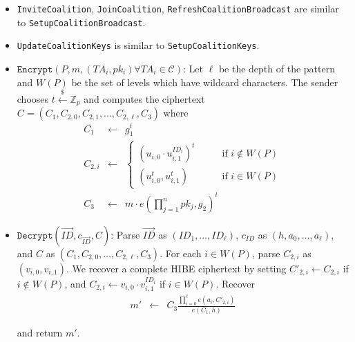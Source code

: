\documentclass[10pt]{llncs}
\newcommand{\C}{\mathcal{C}}
\newcommand{\Zbb}{\mathbb{Z}}
\newcommand{\ID}{\mathit{ID}}
\newcommand{\TA}{\mathit{TA}}
\newcommand{\getsr}{\stackrel{{\scriptscriptstyle\$}}{\gets}}
\begin{document}
\begin{itemize}
\item \texttt{InviteCoalition}, \texttt{JoinCoalition}, \texttt{RefreshCoalitionBroadcast} are similar to \texttt{SetupCoalitionBroadcast}.

\item \texttt{UpdateCoalitionKeys} is similar to \texttt{SetupCoalitionKeys}.



\item $\texttt{Encrypt}(\mathit{P},m, (\TA_i, pk_i) \forall \TA_i \in \C)$: Let $\ell$ be the depth of the pattern and $W(P)$ be the set of levels which have wildcard characters. The sender chooses $t\getsr \Zbb_{p}$ and computes the ciphertext $C=(C_{1},C_{2,0},C_{2,1},...,C_{2,\ell},C_{3})$ where
\begin{eqnarray*}
	C_{1} & \gets & g_{1}^{t} \\
	C_{2,i} & \gets & \left\{
		\begin{array}{ll}
			(u_{i,0} \cdot u_{i,1}^{\ID_{i}})^{t} & \qquad \mbox{if } i \notin W(P) \\
			(u_{i,0}^{t},u_{i,1}^{t}) & \qquad \mbox{if } i \in W(P)
		\end{array}
	\right. \\
	C_{3} &\gets& m \cdot e(\prod_{j=1}^{n} pk_j,g_{2})^{t}
\end{eqnarray*}

\item $\texttt{Decrypt}(\vec{\ID},c_{\vec{\ID}},C)$: Parse $\vec{\ID}$ as $(\ID_{1},\ldots,\ID_{\ell})$, $c_{\ID}$ as $(h,a_{0},\ldots,a_{\ell})$, and $C$ as $(C_{1},C_{2,0},\ldots,C_{2,\ell},C_{3})$. For each $i\in W(P)$, parse $C_{2,i}$ as $(v_{i,0},v_{i,1})$. We recover a complete HIBE ciphertext by setting $C'_{2,i} \gets C_{2,i}$ if $i\notin W(P)$, and $C_{2,i}\gets v_{i,0} \cdot v_{i,1}^{\ID_{i}}$ if $i\in W(P)$. Recover
\begin{eqnarray*}
	m' & \gets & C_{3} \frac{\prod_{i=0}^{\ell} e(a_{i},C'_{2,i})}{e(C_{1},h)}
\end{eqnarray*}

and return $m'$.
\end{itemize}
\end{document}
